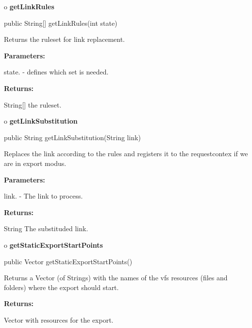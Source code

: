 o {\bf getLinkRules} 

\begin{PRE}
 public String[] getLinkRules(int state)
\end{PRE}

\begin{description}
\htmlDD Returns the ruleset for link replacement. 

\begin{description}
\item {\bf Parameters:}  

state. - defines which set is needed.  
\item {\bf Returns:}  

String[] the ruleset.  
\end{description}

\end{description}

o {\bf getLinkSubstitution} 

\begin{PRE}
 public String getLinkSubstitution(String link)
\end{PRE}

\begin{description}
\htmlDD Replaces the link according to the rules and registers it to the
requestcontex if we are in export modus. 

\begin{description}
\item {\bf Parameters:}  

link. - The link to process.  
\item {\bf Returns:}  

String The substituded link.  
\end{description}

\end{description}

o {\bf getStaticExportStartPoints} 

\begin{PRE}
 public Vector getStaticExportStartPoints()
\end{PRE}

\begin{description}
\htmlDD Returns a Vector (of Strings) with the names of the vfs resources
(files and folders) where the export should start. 

\begin{description}
\item {\bf Returns:}  

Vector with resources for the export.  
\end{description}

\end{description}

